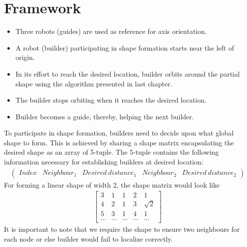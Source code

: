 \documentclass{report}[12pt]
\begin{document}
\section{Framework}
\begin{itemize}
	\item Three robots (guides) are used as reference for axis orientation.
	\item A robot (builder) participating in shape formation starts near the left of origin.
	\item In its effort to reach the desired location, builder orbits around the partial shape using the algorithm presented in last chapter.
	\item The builder stops orbiting when it reaches the desired location.
	\item Builder becomes a guide, thereby, helping the next builder.
\end{itemize}
To participate in shape formation, builders need to decide upon what global shape to form. This is achieved by sharing a shape matrix encapsulating the desired shape as an array of 5-tuple. The 5-tuple contains the following information necessary for establishing builders at desired location:
\begin{align}
	\left(
	\begin{matrix}
	Index & Neighbour_1 & Desired\ distance_1 & Neighbour_2 & Desired\ distance_2 
	\end{matrix}
	\right)
\end{align}
For forming a linear shape of width 2, the shape matrix would look like
\begin{align}
	\label{eq:shape_matrix_linear}
	\begin{bmatrix}
	3      & 1      & 1      & 2      & 1        \\
	4      & 2      & 1      & 3      & \sqrt{2} \\
	5      & 3      & 1      & 4      & 1        \\
	\cdots & \cdots & \cdots & \cdots & \cdots   
	\end{bmatrix}
\end{align}
It is important to note that we require the shape to ensure two neighbours for each node or else builder would fail to localize correctly.
\end{document}
